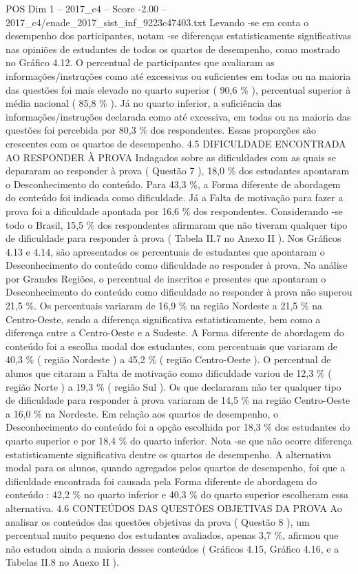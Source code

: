 \begin{textsample}{POS Dim 1 – 2017\_c4 – Score -2.00 – 2017\_c4/enade\_2017\_sist\_inf\_9223c47403.txt}
Levando -se em conta o desempenho dos participantes, notam -se diferenças estatisticamente significativas nas opiniões de estudantes de todos os quartos de desempenho, como mostrado no Gráfico 4.12.
O percentual de participantes que avaliaram as informações/instruções como até excessivas ou suficientes em todas ou na maioria das questões foi mais elevado no quarto superior ( 90,6 \% ), percentual superior à média nacional ( 85,8 \% ).
Já no quarto inferior, a suficiência das informações/instruções declarada como até excessiva, em todas ou na maioria das questões foi percebida por 80,3 \% dos respondentes.
Essas proporções são crescentes com os quartos de desempenho. 4.5 DIFICULDADE ENCONTRADA AO RESPONDER À PROVA Indagados sobre as dificuldades com as quais se depararam ao responder à prova ( Questão 7 ), 18,0 \% dos estudantes apontaram o Desconhecimento do conteúdo.
Para 43,3 \%, a Forma diferente de abordagem do conteúdo foi indicada como dificuldade.
Já a Falta de motivação para fazer a prova foi a dificuldade apontada por 16,6 \% dos respondentes.
Considerando -se todo o Brasil, 15,5 \% dos respondentes afirmaram que não tiveram qualquer tipo de dificuldade para responder à prova ( Tabela II.7 no Anexo II ).
Nos Gráficos 4.13 e 4.14, são apresentados os percentuais de estudantes que apontaram o Desconhecimento do conteúdo como dificuldade ao responder à prova.
Na análise por Grandes Regiões, o percentual de inscritos e presentes que apontaram o Desconhecimento do conteúdo como dificuldade ao responder à prova não superou 21,5 \%.
Os percentuais variaram de 16,9 \% na região Nordeste a 21,5 \% na Centro-Oeste, sendo a diferença significativa estatisticamente, bem como a diferença entre a Centro-Oeste e a Sudeste.
A Forma diferente de abordagem do conteúdo foi a escolha modal dos estudantes, com percentuais que variaram de 40,3 \% ( região Nordeste ) a 45,2 \% ( região Centro-Oeste ).
O percentual de alunos que citaram a Falta de motivação como dificuldade variou de 12,3 \% ( região Norte ) a 19,3 \% ( região Sul ).
Os que declararam não ter qualquer tipo de dificuldade para responder à prova variaram de 14,5 \% na região Centro-Oeste a 16,0 \% na Nordeste.
Em relação aos quartos de desempenho, o Desconhecimento do conteúdo foi a opção escolhida por 18,3 \% dos estudantes do quarto superior e por 18,4 \% do quarto inferior.
Nota -se que não ocorre diferença estatisticamente significativa dentre os quartos de desempenho.
A alternativa modal para os alunos, quando agregados pelos quartos de desempenho, foi que a dificuldade encontrada foi causada pela Forma diferente de abordagem do conteúdo : 42,2 \% no quarto inferior e 40,3 \% do quarto superior escolheram essa alternativa. 4.6 CONTEÚDOS DAS QUESTÕES OBJETIVAS DA PROVA Ao analisar os conteúdos das questões objetivas da prova ( Questão 8 ), um percentual muito pequeno dos estudantes avaliados, apenas 3,7 \%, afirmou que não estudou ainda a maioria desses conteúdos ( Gráficos 4.15, Gráfico 4.16, e a Tabelas II.8 no Anexo II ).

\end{textsample}
